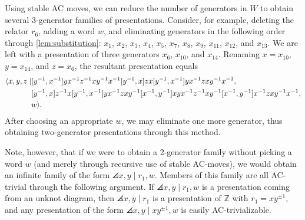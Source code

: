 Using stable AC moves, we can reduce the number of generators in $W$ to obtain several 3-generator families of presentations. Consider, for example, deleting the relator $r_6$, adding a word $w$, and eliminating generators in the following order through \cref{lem:substitution}: $x_1$, $x_2$, $x_3$, $x_4$, $x_5$, $x_7$, $x_8$, $x_9$, $x_{11}$, $x_{12}$, and $x_{13}$. We are left with a presentation of three generators $x_6$, $x_{10}$, and $x_{14}$. Renaming $x = x_{10}$, $y = x_{14}$, and $z=x_6$, the resultant presentation equals
\[
\begin{aligned}
\angles{x, y, z \mid & 
[y^{-1}, x^{-1}]
y x^{-1} z^{-1} x y^{-1} x^{-1} [y^{-1}, x]
z x [y^{-1}, x^{-1}]
y x^{-1} z x y^{-1} x^{-1}, \\
& %
[y^{-1}, x] z^{-1} x 
[y^{-1}, x^{-1}]
y x^{-1} z x y^{-1} 
[x^{-1}, y^{-1}]
x y x^{-1} z^{-1} x y^{-1} 
[x^{-1}, y^{-1}]
x^{-1} z x y^{-1} x^{-1}, \\
& w}.
\end{aligned}
\]
After choosing an appropriate $w$, we may eliminate one more generator, thus obtaining two-generator presentations through this method. 

\begin{remark}
Note, however, that if we were to obtain a 2-generator family without picking a word $w$ (and merely through recursive use of stable AC-moves), we would obtain an infinite family of the form $\angles{ x,y \mid r_1,w }$. Members of this family are all AC-trivial through the following argument. If $\angles{ x,y \mid r_1,w }$ is a presentation coming from an unknot diagram, then $\angles{ x,y \mid r_1 }$ is a presentation of $\mathbb{Z}$ with $r_1 = xy^{\pm 1}$, and any presentation of the form $\angles{ x,y \mid xy^{\pm 1},w }$ is easily AC-trivializable.
\end{remark}



